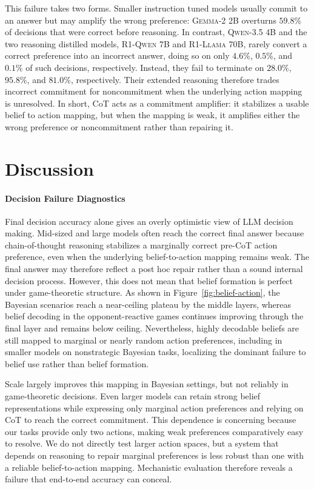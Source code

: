\documentclass[letterpaper]{article} %
\newcommand{\model}[1]{\textsc{#1}}
\begin{document}
This failure takes two forms. Smaller instruction tuned models usually
commit to an answer but may amplify the wrong preference:
\model{Gemma-2} 2B overturns \(59.8\%\) of decisions that were correct
before reasoning. In contrast, \model{Qwen-3.5} 4B and the two reasoning
distilled models, \model{R1-Qwen} 7B and \model{R1-Llama} 70B, rarely
convert a correct preference into an incorrect answer, doing so on only
\(4.6\%\), \(0.5\%\), and \(0.1\%\) of such decisions, respectively.
Instead, they fail to terminate on \(28.0\%\), \(95.8\%\), and
\(81.0\%\), respectively. Their extended reasoning therefore trades
incorrect commitment for noncommitment when the underlying action mapping
is unresolved. In short, CoT acts as a commitment amplifier: it stabilizes a usable belief
to action mapping, but when the mapping is weak, it amplifies either the
wrong preference or noncommitment rather than repairing it.



\section{Discussion}

\paragraph{Decision Failure Diagnostics}
\label{sec:decision-failure-diagnostics}


Final decision accuracy alone gives an overly optimistic view of LLM decision making. Mid-sized and large models often reach the correct final answer because chain-of-thought reasoning stabilizes a marginally correct pre-CoT action preference, even when the underlying belief-to-action mapping remains weak. The final answer may therefore reflect a post hoc repair rather than a sound internal decision process. However, this does not mean that belief formation is perfect under game-theoretic structure. As shown in Figure~\ref{fig:belief-action}, the Bayesian scenarios reach a near-ceiling plateau by the middle layers, whereas belief decoding in the opponent-reactive games continues improving through the final layer and remains below ceiling.  Nevertheless, highly decodable beliefs are still mapped to marginal or nearly random action preferences, including in smaller models on nonstrategic Bayesian tasks, localizing the dominant failure to belief use rather than belief formation.

Scale largely improves this mapping in Bayesian settings, but not reliably in game-theoretic decisions. Even larger models can retain strong belief representations while expressing only marginal action preferences and relying on CoT to reach the correct commitment. This dependence is concerning because our tasks provide only two actions, making weak preferences comparatively easy to resolve. We do not directly test larger action spaces, but a system that depends on reasoning to repair marginal preferences is less robust than one with a reliable belief-to-action mapping. Mechanistic evaluation therefore reveals a failure that end-to-end accuracy can conceal.
\end{document}
